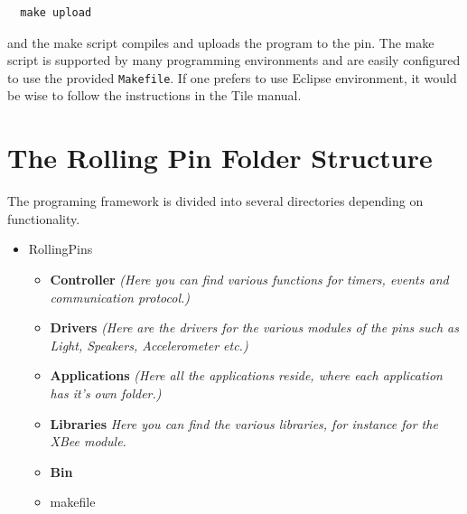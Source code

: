 \documentclass[a4paper, twoside, final]{book}%
\begin{document}
\begin{lstlisting}
  make upload
\end{lstlisting}

and the make script compiles and uploads the program to the pin. The make script is supported by many programming environments and are easily configured to use the provided {\tt Makefile}. If one prefers to use Eclipse environment, it would be wise to follow the instructions in the Tile manual.

\newpage

\section{The Rolling Pin Folder Structure}

The programing framework is divided into several directories depending on functionality.

\begin{itemize}
  \item RollingPins
  \begin{itemize}
    \item \textbf{Controller} {\it (Here you can find various functions for timers, events and communication protocol.)}
    \item \textbf{Drivers} {\it (Here are the drivers for the various modules of the pins such as Light, Speakers, Accelerometer etc.)}
    \item \textbf{Applications} {\it (Here all the applications reside, where each application has it's own folder.)}
    \item \textbf{Libraries} {\it Here you can find the various libraries, for instance for the XBee module.}
    \item \textbf{Bin}
    \item makefile
  \end{itemize}
\end{itemize}
\end{document}
